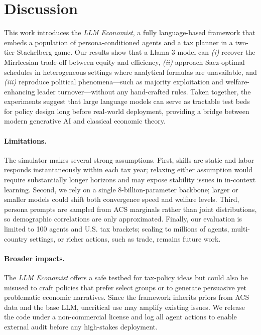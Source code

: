\section{Discussion}
This work introduces the \textit{LLM Economist}, a fully language-based framework that embeds a population of persona-conditioned agents and a tax planner in a two-tier Stackelberg game.  Our results show that a Llama-3 model can \textit{(i)} recover the Mirrleesian trade-off between equity and efficiency, \textit{(ii)} approach Saez-optimal schedules in heterogeneous settings where analytical formulas are unavailable, and \textit{(iii)} reproduce political phenomena—such as majority exploitation and welfare-enhancing leader turnover—without any hand-crafted rules.  Taken together, the experiments suggest that large language models can serve as tractable test beds for policy design long before real-world deployment, providing a bridge between modern generative AI and classical economic theory.

\paragraph{Limitations.}
The simulator makes several strong assumptions.  First, skills are static and labor responds instantaneously within each tax year; relaxing either assumption would require substantially longer horizons and may expose stability issues in in-context learning.  Second, we rely on a single 8-billion-parameter backbone; larger or smaller models could shift both convergence speed and welfare levels.  Third, persona prompts are sampled from ACS marginals rather than joint distributions, so demographic correlations are only approximated.  
Finally, our evaluation is limited to 100 agents and U.S. tax brackets; scaling to millions of agents, multi-country settings, or richer actions, such as trade, remains future work.

\paragraph{Broader impacts.}
The \emph{LLM Economist} offers a safe testbed for tax-policy ideas but could also be misused to craft policies that prefer select groups or to generate persuasive yet problematic economic narratives.  Since the framework inherits priors from ACS data and the base LLM, uncritical use may amplify existing issues.  We release the code under a non-commercial license and log all agent actions to enable external audit before any high-stakes deployment.



